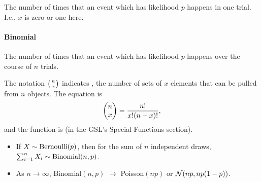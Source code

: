 The number of times that an event which has likelihood $p$ happens in
one trial. I.e., $x$ is zero or one here.

 

\paragraph{Binomial}

The number of times that an event which has likelihood $p$ happens over the
course of $n$ trials.

The notation $\left({n\atop x}\right)$ indicates
, the number of sets of $x$ elements that can be
pulled from $n$ objects. The equation is $$\left(\begin{matrix}n\cr x\end{matrix}\right) =
{n!\over x!(n-x)!},$$ and the function is  
(in the GSL's Special Functions section).
 

 

\begin{itemize}
\item If $X \sim {\rm Bernoulli}(p)$, then for the sum of $n$ independent draws,
$\sum_{i=1}^n X_i \sim {\rm Binomial}(n,p)$.
\item As $n\to\infty$, Binomial$(n,p)$ $\to$ Poisson$(np)$ or ${\cal
N}(np, np(1-p))$.
\end{itemize}

